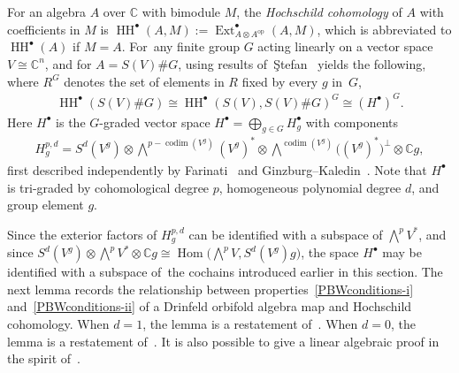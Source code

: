 \documentclass[10pt,a4paper]{amsart}
\numberwithin{equation}{section}
\newcommand{\standout}[1]{\textit{#1}} %
\newcommand{\HHSSG}[1]{\HH^{#1}(S(V),S(V)\#G)}
\DeclareMathOperator{\HH}{HH}
\DeclareMathOperator{\Ext}{Ext}
\DeclareMathOperator{\Hom}{Hom}
\DeclareMathOperator{\codim}{codim}
\begin{document}
For an algebra $A$ over $\mathbb{C}$ with bimodule $M$,
the \standout{Hochschild cohomology} of $A$ with coefficients in $M$ is
$\HH^{\bullet}(A,M):=\Ext_{A\otimes A^{\text{op}}}^{\bullet}(A,M)$, which is
abbreviated to $\HH^{\bullet}(A)$ if $M=A$. For~any finite group $G$ acting linearly on a
vector space $V \cong \mathbb{C}^n$, and for $A=S(V)\# G$,
using results of~\c{S}te\-fan~\cite{Stefan} yields the following,
where $R^G$ denotes the set of elements in $R$ fixed by every $g$ in~$G$,
\begin{gather*}
\HH^{\bullet}(S(V)\#G) \cong\HHSSG{\bullet}^G \cong (H^{\bullet})^G.
\end{gather*}
Here $H^{\bullet}$ is the $G$-graded vector space
$H^{\bullet}=\bigoplus_{g\in G}H^{\bullet}_g$
with components
\begin{gather*}
H^{p,d}_g=S^d(V^{g}) \otimes\bigwedge^{p-\codim(V^g)}(V^g)^{*} \otimes
\bigwedge^{\codim(V^g)}\bigl((V^g)^*\bigr)^{\perp} \otimes
\mathbb{C}g,
\end{gather*}
first described independently by Farinati~\cite{Farinati} and
Ginzburg--Kaledin~\cite{GinzburgKaledin}.
Note that $H^{\bullet}$ is tri-graded by cohomological degree $p$,
homogeneous polynomial degree $d$, and group element $g$.

Since the exterior factors of $H_g^{p,d}$ can be identified
with a subspace of $\bigwedge^pV^*$, and since
$S^d(V^g)\otimes\bigwedge^pV^*\otimes\mathbb{C} g\cong\Hom\big(\bigwedge^p V,S^d(V^g)g\big)$,
the space $H^{\bullet}$ may be identified with a subspace of~the
cochains introduced earlier in this section. The next lemma
records the relationship bet\-ween properties~\eqref{PBWconditions-i}
and~\eqref{PBWconditions-ii} of a Drinfeld orbifold algebra map and Hochschild cohomology.
When $d=1$, the lemma is a restatement of~\cite[Theorem~7.2(i) and (ii)]{SWorbifold}.
When $d=0$, the lemma is a restatement of~\cite[Corollary 8.17(ii)]{SheplerWitherspoon08}.
It is also possible to give a linear algebraic proof %
in the spirit of~\cite[Lemma~1.8]{RamShepler}.
\end{document}
